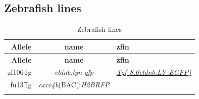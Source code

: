 \documentclass[11pt,singlespacinge,twoside]{reedthesis} %
\begin{document}
\hypertarget{mat-lines}{%
\subsection{Zebrafish lines}\label{mat-lines}}
\begin{longtable}[]{@{}rcl@{}}
\caption{\label{tab:mat-lines} Zebrafish lines}\tabularnewline
\toprule
\begin{minipage}[b]{0.12\columnwidth}\raggedleft
\textbf{Allele}\strut
\end{minipage} & \begin{minipage}[b]{0.29\columnwidth}\centering
\textbf{name}\strut
\end{minipage} & \begin{minipage}[b]{0.50\columnwidth}\raggedright
\textbf{zfin}\strut
\end{minipage}\tabularnewline
\midrule
\endfirsthead
\toprule
\begin{minipage}[b]{0.12\columnwidth}\raggedleft
\textbf{Allele}\strut
\end{minipage} & \begin{minipage}[b]{0.29\columnwidth}\centering
\textbf{name}\strut
\end{minipage} & \begin{minipage}[b]{0.50\columnwidth}\raggedright
\textbf{zfin}\strut
\end{minipage}\tabularnewline
\midrule
\endhead
\begin{minipage}[t]{0.12\columnwidth}\raggedleft
zf106Tg\strut
\end{minipage} & \begin{minipage}[t]{0.29\columnwidth}\centering
\emph{cldnb:lyn-gfp}\strut
\end{minipage} & \begin{minipage}[t]{0.50\columnwidth}\raggedright
\href{//zfin.org/ZDB-ALT-060919-2}{\emph{Tg(-8.0cldnb:LY-EGFP)}}\strut
\end{minipage}\tabularnewline
\begin{minipage}[t]{0.12\columnwidth}\raggedleft
fu13Tg\strut
\end{minipage} & \begin{minipage}[t]{0.29\columnwidth}\centering
\emph{cxcr4b}(BAC):\emph{H2BRFP}\strut
\end{minipage} & \begin{minipage}[t]{0.50\columnwidth}\raggedright
\strut
\end{minipage}\tabularnewline
\begin{minipage}[t]{0.12\columnwidth}\raggedleft

\end{minipage}
\end{longtable}
\end{document}
